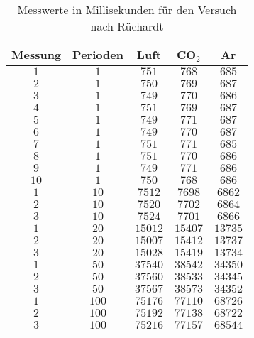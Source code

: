 \documentclass[12pt, a4paper, twoside]{scrartcl}
\begin{document}
\begin{table} [H]
\centering
\begin{tabular}{|c|c||c|c|c|} \hline
    Messung & Perioden & Luft & CO$_2$ & Ar \\\hline
    $1 $&$ 1 $&$ 751 $&$ 768 $&$ 685$ \\
    $2 $&$ 1 $&$ 750 $&$ 769 $&$ 687$ \\
    $3 $&$ 1 $&$ 749 $&$ 770 $&$ 686$ \\
    $4 $&$ 1 $&$ 751 $&$ 769 $&$ 687$ \\
    $5 $&$ 1 $&$ 749 $&$ 771 $&$ 687$ \\
    $6 $&$ 1 $&$ 749 $&$ 770 $&$ 687$ \\
    $7 $&$ 1 $&$ 751 $&$ 771 $&$ 685$ \\
    $8 $&$ 1 $&$ 751 $&$ 770 $&$ 686$ \\
    $9 $&$ 1 $&$ 749 $&$ 771 $&$ 686$ \\
    $10 $&$ 1 $&$ 750 $&$ 768 $&$ 686$ \\
    \hline
    $1 $&$ 10 $&$ 7512 $&$ 7698 $&$ 6862$ \\
    $2 $&$ 10 $&$ 7520 $&$ 7702 $&$ 6864$ \\
    $3 $&$ 10 $&$ 7524 $&$ 7701 $&$ 6866$ \\
    \hline
    $1 $&$ 20 $&$ 15012 $&$ 15407 $&$ 13735$ \\
    $2 $&$ 20 $&$ 15007 $&$ 15412 $&$ 13737$ \\
    $3 $&$ 20 $&$ 15028 $&$ 15419 $&$ 13734$ \\
    \hline
    $1 $&$ 50 $&$ 37540 $&$ 38542 $&$ 34350$ \\
    $2 $&$ 50 $&$ 37560 $&$ 38533 $&$ 34345 $\\
    $3 $&$ 50 $&$ 37567 $&$ 38573 $&$ 34352 $\\
    \hline
    $1 $&$ 100 $&$ 75176 $&$ 77110 $&$ 68726$ \\
    $2 $&$ 100 $&$ 75192 $&$ 77138 $&$ 68722$ \\
    $3 $&$ 100 $&$ 75216 $&$ 77157 $&$ 68544$ \\
    \hline
 \end{tabular} 
 \caption{\label{tab:}Messwerte in Millisekunden für den Versuch nach Rüchardt}
\end{table}
\end{document}
